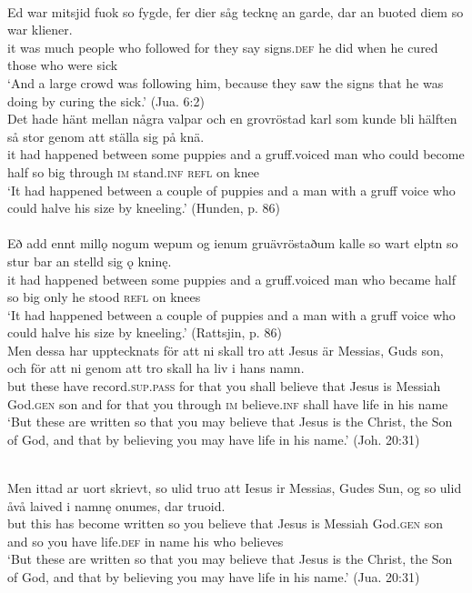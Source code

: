 \documentclass[output=paper]{langscibook}
\begin{document}
\ex {}\label{ex:kalm:27b}\\
\gll Ed war mitsjid fuok so fygde, fer dier såg tecknę an garde, dar an buoted diem so war kliener.\\
 it was much people who followed for they say signs.\textsc{def} he did when he cured those who were sick\\
\glt ‘And a large crowd was following him, because they saw the signs that he was doing by curing the sick.’ (Jua. 6:2)
\z
\ex
\label{ex:kalm:28}
\ea {}\label{ex:kalm:28a}\\
\gll Det hade hänt mellan några valpar och en grovröstad karl som kunde bli hälften så stor genom att ställa sig på knä.\\
 it had happened between some puppies and a gruff.voiced man who could become half so big through \textsc{im} stand.\textsc{inf} \textsc{refl} on knee\\
\glt ‘It had happened between a couple of puppies and a man with a gruff voice who could halve his size by kneeling.’ (Hunden, p. 86)\\

\ex {}\label{ex:kalm:28b}\\ 
\gll Eð add ennt millǫ nogum wepum og ienum gruävröstaðum kalle so wart elptn so stur bar an stelld sig ǫ kninę.\\
it had happened between some puppies and a gruff.voiced man who became half so big only he stood \textsc{refl} on knees\\
\glt ‘It had happened between a couple of puppies and a man with a gruff voice who could halve his size by kneeling.’ (Rattsjin, p. 86)
\z 
\ex
\label{ex:kalm:29}
\ea {} \label{ex:kalm:29a}\\
\gll Men dessa har upptecknats för att ni skall tro att Jesus är Messias, Guds son, och för att ni genom att tro skall ha liv i hans namn.\\
but these have record.\textsc{sup.pass} for that you shall believe that Jesus is Messiah God.\textsc{gen} son and for that you through \textsc{im} believe.\textsc{inf} shall have life in his name \\
\glt ‘But these are written so that you may believe that Jesus is the Christ, the Son of God, and that by believing you may have life in his name.’ (Joh. 20:31)

\ex {}\label{ex:kalm:29b}\\ 
\gll Men ittad ar uort skrievt, so ulid truo att Iesus ir Messias, Gudes Sun, og so ulid åvå laived i namnę onumes, dar truoid.\\
 but this has become written so you believe that Jesus is Messiah God.\textsc{gen} son and so you have life.\textsc{def} in name his who believes\\
\glt ‘But these are written so that you may believe that Jesus is the Christ, the Son of God, and that by believing you may have life in his name.’ (Jua. 20:31)
\z
\z 
\end{document}
